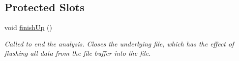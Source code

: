 \subsection*{Protected Slots}
\begin{DoxyCompactItemize}
\item 
\hypertarget{class_picto_1_1_analysis_file_output_a863378c58685a0766caeaf494e16e0aa}{void \hyperlink{class_picto_1_1_analysis_file_output_a863378c58685a0766caeaf494e16e0aa}{finish\-Up} ()}\label{class_picto_1_1_analysis_file_output_a863378c58685a0766caeaf494e16e0aa}

\begin{DoxyCompactList}\small\item\em Called to end the analysis. Closes the underlying file, which has the effect of flushing all data from the file buffer into the file. \end{DoxyCompactList}\end{DoxyCompactItemize}
